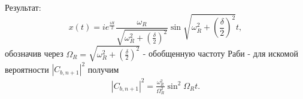 Результат:
\begin{equation}
  x\left(t\right) = i e^{\frac{i \delta t}{2}}
  \frac{\omega_R}{\sqrt{\omega_R^2 + \left(\frac{\delta}{2}\right)^2}}
  \sin{\sqrt{\omega_R^2 + \left(\frac{\delta}{2}\right)^2}t},
  \nonumber
\end{equation}
обозначив через $\Omega_R = \sqrt{\omega_R^2 + \left(\frac{\delta}{2}\right)^2}$ -
обобщенную частоту Раби - для искомой вероятности
$\left|C_{b,n+1}\right|^2$ получим
\begin{eqnarray}
  \left|C_{b,n+1}\right|^2 = \frac{\omega_R^2}{\Omega_R^2}
  \sin^2{\Omega_R t}.
  \nonumber
\end{eqnarray}
